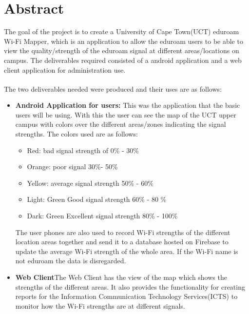 \section*{Abstract}
The goal of the project is to create a University of Cape Town(UCT) eduroam Wi-Fi Mapper, which is an application to allow the  eduroam users to be able to view the quality/strength of the eduroam signal at different areas/locations on campus. The deliverables required consisted of a android application and a web client application for administration use.
\paragraph{}The two deliverables needed were produced and their uses are as follows:
\begin{itemize}
	\item \textbf{Android Application for users: }This was the application that the basic users will be using. With this the user can see the map of the UCT upper campus with colors over the different areas/zones indicating the signal strengths. The colors used are as follows:
	\begin{itemize}
		\item Red: bad signal strength of 0\% - 30\%
		\item Orange: poor signal 30\%- 50\%
		\item Yellow: average signal strength 50\% - 60\%
		\item Light: Green Good signal strength 60\% - 80 \%
		\item Dark:	 Green Excellent signal strength 80\% - 100\%
	\end{itemize}
	The user phones are also used to record Wi-Fi strengths of the different location areas together and send it to a database hosted on Firebase to update the average Wi-Fi strength of the whole area. If the Wi-Fi name is not eduroam the data is disregarded.
	
	\item \textbf{Web Client}The Web Client has the view of the map which shows the strengths of the different areas. It also provides the functionality for creating reports for the Information Communication Technology Services(ICTS) to monitor how the Wi-Fi strengths are at different signals.
\end{itemize}
